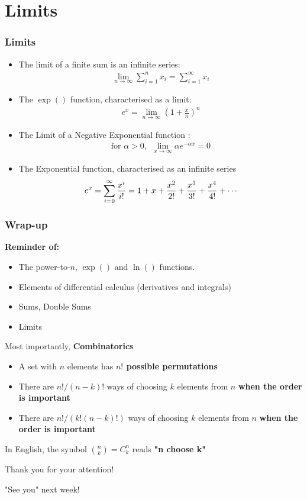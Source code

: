 \documentclass[notes=show]{beamer}\usepackage[]{graphicx}\usepackage[]{color}
\newcommand{\bea}{\begin{eqnarray}}
\newcommand{\eea}{\end{eqnarray}}
\begin{document}
\section{Limits}

\begin{frame}
\frametitle{Limits}

\begin{itemize}
\item The limit of a finite sum is an infinite series:
\bea
\lim_{n \to \infty} \sum_{i=1}^n x_i = \sum_{i=1 }^\infty x_i \nonumber
\eea
\item The $\exp()$ function, characterised as a limit:
\bea
e^x = \lim_{n \rightarrow \infty} \left(1 + \frac{x}{n}\right)^n \nonumber
\eea
\item The Limit of a Negative Exponential function :
\bea
\text{for }\alpha >0, \ \  \lim_{x \to \infty} {\alpha e^{-\alpha x}} = 0 \nonumber
\eea
\item The Exponential function, characterised as an infinite series
\bea
e^x = \sum_{i = 0}^{\infty} {x^i \over i!} = 1 + x + {x^2 \over 2!} + {x^3 \over 3!} + {x^4 \over 4!} + \cdots \nonumber
\eea
\end{itemize}
\end{frame}


\begin{frame}
\frametitle{Wrap-up}


\textbf{Reminder of:}
\begin{itemize}
\item The power-to-$n$, $\exp()$ and $\ln()$ functions.
\item Elements of differential calculus (derivatives and integrals)
\item Sums, Double Sums
\item Limits
\end{itemize}
\pause

Most importantly, \textbf{Combinatorics}

\begin{itemize}
\item A set with $n$ elements has \textbf{$n!$ possible permutations}
\item There are $n!/(n-k)!$ ways of choosing $k$ elements from $n$ \textbf{when the order is important}
\item There are $n!/(k!(n-k)!)$ ways of choosing $k$ elements from $n$ \textbf{when the order is important}
\end{itemize}


\begin{center}
In English, the symbol $\binom n k = C^n_k$ reads \textbf{"n choose k"}
\end{center}

\end{frame}

\begin{frame}
	\begin{center}

		\LARGE{Thank you for your attention!}

		\pause

		\LARGE{"See you" next week!}
	\end{center}
\end{frame}
\end{document}
